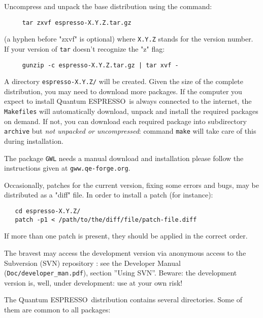 \documentclass[12pt,a4paper]{article}
\def\qe{{\sc Quantum ESPRESSO}}
\begin{document}
Uncompress and unpack the base distribution using the command:
\begin{verbatim}
     tar zxvf espresso-X.Y.Z.tar.gz
\end{verbatim}
(a hyphen before "zxvf" is optional) where \texttt{X.Y.Z} stands for the
version number. If your version of \texttt{tar} 
doesn't recognize the "z" flag:
\begin{verbatim}
     gunzip -c espresso-X.Y.Z.tar.gz | tar xvf -
\end{verbatim}
A directory \texttt{espresso-X.Y.Z/} will be created. Given the size 
of the complete distribution, you may need to download more packages.
If the computer you expect to install \qe\ is always connected
to the internet, the \texttt{Makefiles} will automatically download,
unpack and install the required packages on demand. If not,
you can download each required package into subdirectory
\texttt{archive} but {\em not unpacked or uncompressed}:
command \texttt{make} will take care of this during installation. 

The package \texttt{GWL} needs a manual download and installation please
follow the instructions given at \texttt{gww.qe-forge.org}.

Occasionally, patches for the current version, fixing some errors and bugs,
may be distributed as a "diff" file. In order to install a patch (for 
instance):
\begin{verbatim}
   cd espresso-X.Y.Z/
   patch -p1 < /path/to/the/diff/file/patch-file.diff
\end{verbatim}
If more than one patch is present, they should be applied in the correct order.

The bravest 
may access the development version via anonymous access to the
Subversion (SVN) repository : see the Developer Manual
(\texttt{Doc/developer\_man.pdf}), section ''Using SVN''.
Beware: the development version 
is, well, under development: use at your own risk! 

The \qe\ distribution contains several directories. Some of them are
common to all packages:
\end{document}
